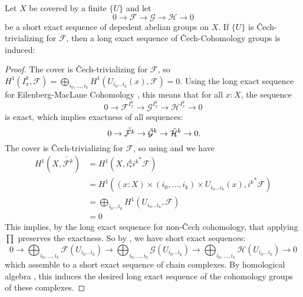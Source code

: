 \begin{theorem}%
  \label{cech-les}
  Let $X$ be covered by a finite $\{U\}$ and let 
  \[ 0\to \mathcal F\to \mathcal G\to \mathcal H\to 0\]
  be a short exact sequence of depedent abelian groups on $X$.
  If $\{U\}$ is \v{C}ech-trivializing for $\mathcal F$,
  then a long exact sequence of \v{C}ech-Cohomology groups is induced:
  \begin{center}
  \end{center}
\end{theorem}

\begin{proof}
  The cover is \v{C}ech-trivializing for $\mathcal F$,
  so $H^1(I_x^k,\mathcal F)=\bigoplus_{i_0,\dots,i_k} H^1(U_{i_0\dots i_k}(x),\mathcal F)=0$.
  Using the long exact sequence for Eilenberg-MacLane Cohomology ,
  this means that for all $x:X$, the sequence
  \[
    0\to {\mathcal F}^{I^k_x}\to {\mathcal G}^{I^k_x}\to {\mathcal H}^{I^k_x}\to 0
  \]
  is exact, which implies exactness of all sequences:
  \[
    0\to \check{\mathcal F^k}\to \check{\mathcal G}^k\to \check{\mathcal H}^k\to 0
    \rlap{.}
  \]
  The cover is \v{C}ech-trivializing for $\mathcal F$, so using  and  we have
  \begin{align*}
    H^1(X,\check{\mathcal F^k})&=H^1(X,i_\ast^k {i^k}^\ast\mathcal F) \\
                               &=H^1((x:X)\times (i_0,\dots,i_k)\times U_{i_0\dots i_k}(x),{i^k}^\ast\mathcal F) \\
                               &=\bigoplus_{i_0\dots i_k} H^1(U_{i_0\dots i_k},\mathcal F) \\
                               &=0    
  \end{align*}
  This implies, by the long exact sequence for non-\v{C}ech cohomology, that applying $\prod$ preserves the exactness.
  So by , we have short exact sequences:
  \[
  0\to \bigoplus_{i_0,\dots,i_k}\mathcal F(U_{i_0\dots i_k}) \to \bigoplus_{i_0,\dots,i_k}\mathcal G(U_{i_0\dots i_k}) \to \bigoplus_{i_0,\dots,i_k}\mathcal H(U_{i_0\dots i_k})\to 0
  \]
  which assemble to a short exact sequence of chain complexes.
  By homological algebra \cite[\href{https://stacks.math.columbia.edu/tag/0117}{Tag 0117}]{stacks-project}, this induces the desired long exact sequence of the cohomology groups of these complexes.
\end{proof}

